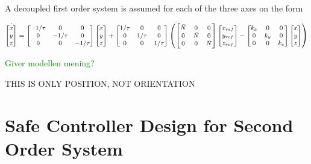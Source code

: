 A decoupled first order system is assumed for each of the three axes on the form

\begin{equation}
\small
\dot{\begin{bmatrix}
	x\\y\\z
	\end{bmatrix}} =
\begin{bmatrix}
-1/\tau & 0 & 0\\0 & -1/\tau & 0 \\ 0 & 0 & -1/\tau
\end{bmatrix}
\begin{bmatrix}
x\\y\\z
\end{bmatrix} +
\begin{bmatrix}
1/\tau& 0 & 0 \\ 0& 1/\tau & 0 \\0& 0& 1/\tau
\end{bmatrix} 
\left(
\begin{bmatrix}
\bar{N} & 0 & 0 \\0 & \bar{N} & 0 \\0& 0& \bar{N}
\end{bmatrix}
\begin{bmatrix}
x_{ref}\\y_{ref}\\z_{ref}
\end{bmatrix}
-
\begin{bmatrix}
k_x & 0 & 0 \\0 & k_y & 0 \\0& 0&  k_z
\end{bmatrix}
\begin{bmatrix}
x\\y\\z
\end{bmatrix}
\right)
\end{equation}

\textcolor{green}{Giver modellen mening?}

THIS IS ONLY POSITION, NOT ORIENTATION

\section{Safe Controller Design for Second Order System}